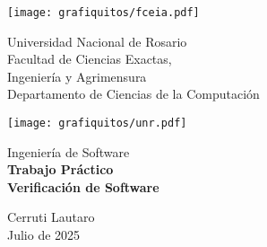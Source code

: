 \documentclass[a4paper, 12pt]{article}
\begin{document}
\renewcommand{\tablename}{Tabla}
\renewcommand{\refname}{Referencias y Bibliografía}


\begin{titlepage}

\begin{minipage}{2.6cm}
\texttt{[image: grafiquitos/fceia.pdf]}
\end{minipage}
\hfill
%
\begin{minipage}{6cm}
\begin{center}
\normalsize{Universidad Nacional de Rosario\\
Facultad de Ciencias Exactas,\\
Ingeniería y Agrimensura\\
Departamento de Ciencias de la Computación\\}
\end{center}
\end{minipage}
\hspace{0.5cm} %
\hfill
\begin{minipage}{2.6cm}
\texttt{[image: grafiquitos/unr.pdf]}
\end{minipage}

\vspace{0.5cm} %

\begin{center}
\normalsize{\sc Ingeniería de Software}\\
\vspace{0.5cm}
\Large{\bf Trabajo Práctico
}\\
\Large{\bf Verificación de Software 
}\\

\vspace{5cm}

\normalsize
Cerruti Lautaro\\

\vspace*{0.5cm}
\small{Julio de 2025}

\vspace*{3cm}


\vspace{5cm}

\normalsize

\end{center}
\end{titlepage}
\end{document}
